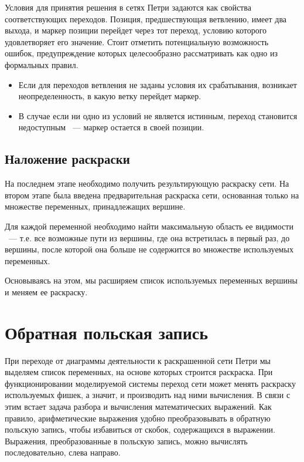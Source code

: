 Условия для принятия решения в сетях Петри задаются как свойства соответствующих переходов. Позиция, предшествующая ветвлению, имеет два выхода, и маркер позиции перейдет через тот переход, условию которого удовлетворяет его значение. Стоит отметить потенциальную возможность ошибок, предупреждение которых целесообразно рассматривать как одно из формальных правил.
\begin{itemize}
\item Если для переходов ветвления не заданы условия их срабатывания, возникает неопределенность, в какую ветку перейдет маркер.
\item В случае если ни одно из условий не является истинным, переход становится недоступным ~--- маркер остается в своей позиции.
\end{itemize}

\subsection{Наложение раскраски}

На последнем этапе необходимо получить результирующую раскраску сети. На втором этапе была введена предварительная раскраска сети, основанная только на множестве переменных, принадлежащих вершине.

Для каждой переменной необходимо найти максимальную область ее видимости ~--- т.е. все возможные пути из вершины, где она встретилась в первый раз, до вершины, после которой она больше не содержится во множестве используемых переменных.

Основываясь на этом, мы расширяем список используемых переменных вершины и меняем ее раскраску.

\section{Обратная польская запись}

При переходе от диаграммы деятельности к раскрашенной сети Петри мы выделяем список переменных, на основе которых строится раскраска. При функционировании моделируемой системы переход сети может менять раскраску используемых фишек, а значит, и производить над ними вычисления. В связи с этим встает задача разбора и вычисления математических выражений. Как правило, арифметические выражения удобно преобразовывать в обратную польскую запись, чтобы избавиться от скобок, содержащихся в выражении. Выражения, преобразованные в польскую запись, можно вычислять последовательно, слева направо.

